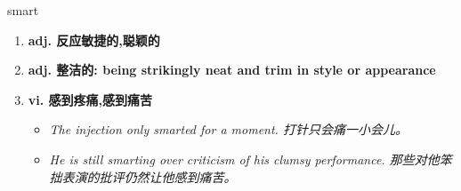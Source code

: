 
\begin{frame}
{\huge smart}
\begin{center}
\begin{enumerate}\Large
  \item \textbf{adj. 反应敏捷的,聪颖的}
  \item \textbf{adj. 整洁的: being strikingly neat and trim in style or appearance}
  \item \textbf{vi. 感到疼痛,感到痛苦}
  \begin{itemize}
    \item \em{\Large{The injection only smarted for a moment. 打针只会痛一小会儿。}}
    \item \em{\Large{He is still smarting over criticism of his clumsy performance. 那些对他笨拙表演的批评仍然让他感到痛苦。}}
  \end{itemize}
\end{enumerate}
\end{center}
\end{frame}
